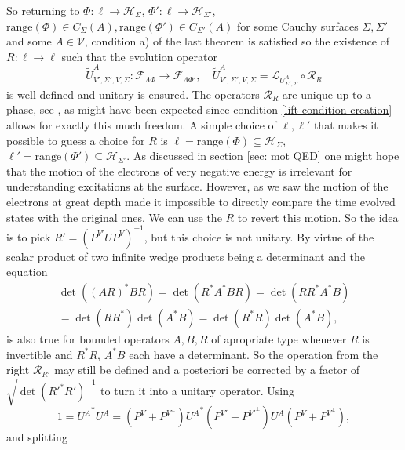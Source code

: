 \documentclass[b5paper,draft,openbib,12pt]{memoir}
\begin{document}
So returning to \(\Phi:\ell\rightarrow \mathcal{H}_\Sigma\), 
\(\Phi':\ell\rightarrow \mathcal{H}_{\Sigma'}\), 
\(\mathrm{range}(\Phi)\in C_{\Sigma}(A),
\mathrm{range}(\Phi')\in C_{\Sigma'}(A)\) for some 
Cauchy surfaces \(\Sigma, \Sigma'\) and some \(A\in\mathcal{V}\),
condition a) of the last theorem is satisfied so 
the existence of \(R:\ell \rightarrow \ell\) 
such that the evolution operator 
\begin{equation}
  \tilde{U}^A_{V',\Sigma',V,\Sigma}:\mathcal{F}_{\mathsf{\Lambda}\Phi}\rightarrow \mathcal{F}_{\mathsf{\Lambda}\Phi'},
  \quad \tilde{U}^A_{V',\Sigma',V,\Sigma}= \mathcal{L}_{U^A_{\Sigma',\Sigma}} \circ \mathcal{R}_R
\end{equation}
is well-defined and unitary is ensured. 
The operators 
\(\mathcal{R}_R\) are unique up to a phase, see 
\cite[Cor. 2.28]{ivp0}, as might have been expected since 
condition \eqref{lift condition creation} allows for 
exactly this much freedom. A simple choice of 
\(\ell, \ell'\) that makes it possible to guess a 
choice for \(R\) is \(\ell=\mathrm{range}(\Phi)\subseteq \mathcal{H}_\Sigma\),
\(\ell'=\mathrm{range}(\Phi')\subseteq \mathcal{H}_{\Sigma'}\).
As discussed in section \ref{sec: mot QED} one might hope 
that the motion of the electrons of very negative energy
is irrelevant for understanding excitations at the surface. 
However, as we saw the motion of the electrons at great depth
made it impossible to directly compare the time evolved 
states with the original ones.
We can use the \(R\) to revert this motion.  
So the idea is to pick \(R'= (P^{V'}U P^V)^{-1}\), but 
this choice is not unitary. By virtue of the scalar product 
of two infinite wedge products being a determinant and 
the equation 
\begin{align}\label{right op calculation}
  \det((A R)^* B R)= \det(R^* A^* B R)
  = \det (R R^* A^* B)\\
  = \det (R R^*) \det (A^* B)
  =\det ( R^* R) \det (A^* B),
\end{align}
is also true for bounded operators \(A,B,R\) 
of apropriate type whenever 
\(R\) is invertible and \(R^* R\), \(A^*B\) each have 
a determinant. So the operation from the 
right \(\mathcal{R}_{R'}\) may still be defined and
a posteriori be corrected by a factor of 
\(\sqrt{\det ( {R'}^* R')^{-1}}\) to turn 
it into a unitary operator.
Using
\begin{equation}
1= {U^A}^* U^A =(P^V+P^{V^\perp}) {U^A}^* (P^{V'}+P^{{V'}^\perp}) U^A (P^V+P^{V^\perp}),
\end{equation}
and splitting 
\end{document}
